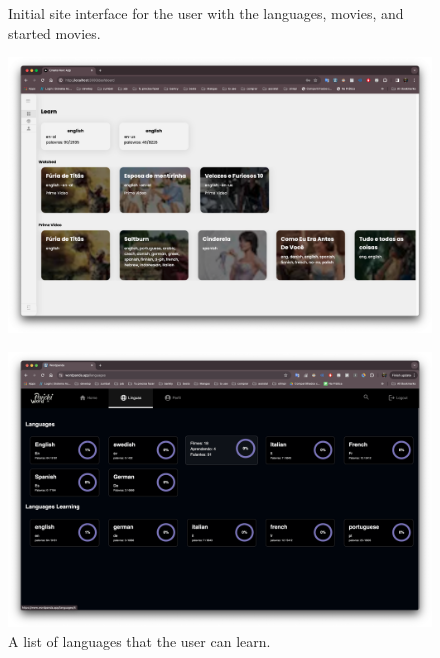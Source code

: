 \documentclass[12pt]{article}
\begin{document}
\begin{frame}{}
  \begin{figure}[!h]
      \begin{minipage}[b]{0.5\linewidth}
        \centering
        \caption{
        Initial site interface for the user with the languages, movies, and started movies.
         }
        \label{fig:site1}
        \includegraphics[width=1\textwidth]{assets/20.png}

      \end{minipage}
      \hspace{0.2cm}
      \begin{minipage}[b]{0.5\linewidth}
        \centering
        \caption{
        A list of languages that the user can learn. 
        }
        \label{fig:site2}
        \includegraphics[width=1\textwidth]{assets/21.png}
      \end{minipage}
  \end{figure}
\end{frame}
\end{document}
